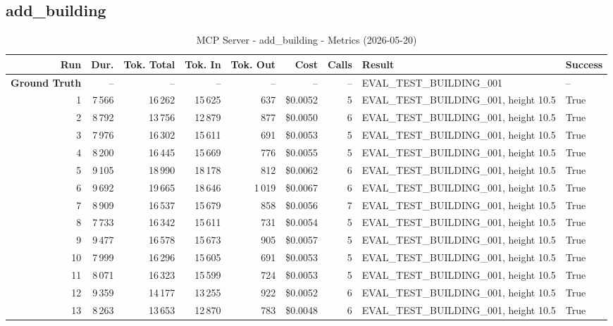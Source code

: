 \documentclass[a4paper,11pt]{article}
\begin{document}
\clearpage
\subsection{add\_building}

\begin{table}[ht]
\centering
\scriptsize
\caption{MCP Server - add\_building - Metrics (2026-05-20)}
\label{tab:mcp\_add\_building\_metrics\_2026-05-20}
\begin{tabular}{r r r r r r r p{3cm} l}
\hline
Run & Dur. & Tok. Total & Tok. In & Tok. Out & Cost & Calls & Result & Success \\
\hline
\textbf{Ground Truth} & -- & -- & -- & -- & -- & -- & EVAL\_TEST\_BUILDING\_001 & -- \\
\hline
1 & 7\,566 & 16\,262 & 15\,625 & 637 & \$0.0052 & 5 & EVAL\_TEST\_BUILDING\_001, height 10.5 & True \\
2 & 8\,792 & 13\,756 & 12\,879 & 877 & \$0.0050 & 6 & EVAL\_TEST\_BUILDING\_001, height 10.5 & True \\
3 & 7\,976 & 16\,302 & 15\,611 & 691 & \$0.0053 & 5 & EVAL\_TEST\_BUILDING\_001, height 10.5 & True \\
4 & 8\,200 & 16\,445 & 15\,669 & 776 & \$0.0055 & 5 & EVAL\_TEST\_BUILDING\_001, height 10.5 & True \\
5 & 9\,105 & 18\,990 & 18\,178 & 812 & \$0.0062 & 6 & EVAL\_TEST\_BUILDING\_001, height 10.5 & True \\
6 & 9\,692 & 19\,665 & 18\,646 & 1\,019 & \$0.0067 & 6 & EVAL\_TEST\_BUILDING\_001, height 10.5 & True \\
7 & 8\,909 & 16\,537 & 15\,679 & 858 & \$0.0056 & 7 & EVAL\_TEST\_BUILDING\_001, height 10.5 & True \\
8 & 7\,733 & 16\,342 & 15\,611 & 731 & \$0.0054 & 5 & EVAL\_TEST\_BUILDING\_001, height 10.5 & True \\
9 & 9\,477 & 16\,578 & 15\,673 & 905 & \$0.0057 & 5 & EVAL\_TEST\_BUILDING\_001, height 10.5 & True \\
10 & 7\,999 & 16\,296 & 15\,605 & 691 & \$0.0053 & 5 & EVAL\_TEST\_BUILDING\_001, height 10.5 & True \\
11 & 8\,071 & 16\,323 & 15\,599 & 724 & \$0.0053 & 5 & EVAL\_TEST\_BUILDING\_001, height 10.5 & True \\
12 & 9\,359 & 14\,177 & 13\,255 & 922 & \$0.0052 & 6 & EVAL\_TEST\_BUILDING\_001, height 10.5 & True \\
13 & 8\,263 & 13\,653 & 12\,870 & 783 & \$0.0048 & 6 & EVAL\_TEST\_BUILDING\_001, height 10.5 & True \\

\end{tabular}
\end{table}
\end{document}
